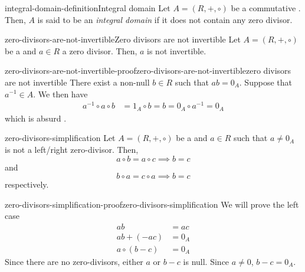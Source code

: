 \documentclass[preview]{standalone}
\begin{document}
\begin{snippetdefinition}{integral-domain-definition}{Integral domain}
    Let \(A = (R, +, \circ)\) be a commutative \ring.
    Then, \(A\) is said to be an \emph{integral domain}
    if it does not contain any zero divisor.
\end{snippetdefinition}

\begin{snippetproposition}{zero-divisors-are-not-invertible}{Zero divisors are not invertible}
    Let \(A = (R, +, \circ)\) be a \ring and \(a \in R\)
    a zero divisor. Then, \(a\) is not invertible.
\end{snippetproposition}

\begin{snippetproof}{zero-divisors-are-not-invertible-proof}{zero-divisors-are-not-invertible}{zero divisors are not invertible}
    There exist a non-null \(b \in R\) such that \(ab = 0_A\).
    Suppose that \(a^{-1} \in A\). We then have
    \begin{align*}
        a^{-1} \circ a \circ b &= 1_A \circ b = b = 0_A \circ a^{-1} = 0_A
    \end{align*}
    which is absurd \lightning.
\end{snippetproof}

\begin{snippetproposition}{zero-divisors-simplification}{}
    Let \(A = (R, +, \circ)\) be a \ring and \(a \in R\)
    such that \(a\neq 0_A\) is not a left/right zero-divisor. Then,
    \[
        a \circ b = a \circ c \implies b = c
    \]
    and
    \[
        b \circ a = c \circ a \implies b = c
    \]
    respectively.
\end{snippetproposition}

\begin{snippetproof}{zero-divisors-simplification-proof}{zero-divisors-simplification}{}
    We will prove the left case
    \begin{align*}
        ab &= ac \\
        ab + (-ac) &= 0_A \\
        a\circ (b-c) &= 0_A
    \end{align*}
    Since there are no zero-divisors, either \(a\) or \(b-c\) is null.
    Since \(a \neq 0\), \(b-c = 0_A\).
\end{snippetproof}
\end{document}
